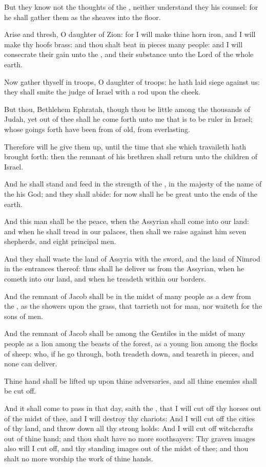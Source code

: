 \Verse But they know not the thoughts of the \LORD, neither understand they his counsel: for he shall gather them as the sheaves into the floor.

\Verse Arise and thresh, O daughter of Zion: for I will make thine horn iron, and I will make thy hoofs brass: and thou shalt beat in pieces many people: and I will consecrate their gain unto the \LORD, and their substance unto the Lord of the whole earth.


\Chapter
\Verse Now gather thyself in troops, O daughter of troops: he hath laid siege against us: they shall smite the judge of Israel with a rod upon the cheek.

\Verse But thou, Bethlehem Ephratah, though thou be little among the thousands of Judah, yet out of thee shall he come forth unto me that is to be ruler in Israel; whose goings forth have been from of old, from everlasting.

\Verse Therefore will he give them up, until the time that she which travaileth hath brought forth: then the remnant of his brethren shall return unto the children of Israel.

\Verse And he shall stand and feed in the strength of the \LORD, in the majesty of the name of the \LORD his God; and they shall abide: for now shall he be great unto the ends of the earth.

\Verse And this man shall be the peace, when the Assyrian shall come into our land: and when he shall tread in our palaces, then shall we raise against him seven shepherds, and eight principal men.

\Verse And they shall waste the land of Assyria with the sword, and the land of Nimrod in the entrances thereof: thus shall he deliver us from the Assyrian, when he cometh into our land, and when he treadeth within our borders.

\Verse And the remnant of Jacob shall be in the midst of many people as a dew from the \LORD, as the showers upon the grass, that tarrieth not for man, nor waiteth for the sons of men.

\Verse And the remnant of Jacob shall be among the Gentiles in the midst of many people as a lion among the beasts of the forest, as a young lion among the flocks of sheep: who, if he go through, both treadeth down, and teareth in pieces, and none can deliver.

\Verse Thine hand shall be lifted up upon thine adversaries, and all thine enemies shall be cut off.

\Verse And it shall come to pass in that day, saith the \LORD, that I will cut off thy horses out of the midst of thee, and I will destroy thy chariots: \Verse And I will cut off the cities of thy land, and throw down all thy strong holds: \Verse And I will cut off witchcrafts out of thine hand; and thou shalt have no more soothsayers: \Verse Thy graven images also will I cut off, and thy standing images out of the midst of thee; and thou shalt no more worship the work of thine hands.


